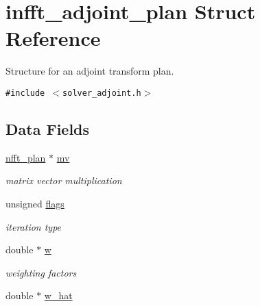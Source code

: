 \hypertarget{structinfft__adjoint__plan}{
\section{infft\_\-adjoint\_\-plan Struct Reference}
\label{structinfft__adjoint__plan}
}
Structure for an adjoint transform plan.  


{\tt \#include $<$solver\_\-adjoint.h$>$}

\subsection*{Data Fields}
\begin{CompactItemize}
\item 
\hypertarget{structinfft__adjoint__plan_320424336d0f74f0d24cc67053dea7ca}{
\hyperlink{structnfft__plan}{nfft\_\-plan} $\ast$ \hyperlink{structinfft__adjoint__plan_320424336d0f74f0d24cc67053dea7ca}{mv}}
\label{structinfft__adjoint__plan_320424336d0f74f0d24cc67053dea7ca}

\begin{CompactList}\small\item\em matrix vector multiplication \item\end{CompactList}\item 
\hypertarget{structinfft__adjoint__plan_83f3fc443fbf5c40336a46a8c1bdfaf8}{
unsigned \hyperlink{structinfft__adjoint__plan_83f3fc443fbf5c40336a46a8c1bdfaf8}{flags}}
\label{structinfft__adjoint__plan_83f3fc443fbf5c40336a46a8c1bdfaf8}

\begin{CompactList}\small\item\em iteration type \item\end{CompactList}\item 
\hypertarget{structinfft__adjoint__plan_67fabb54885946acaaad95a5a472b004}{
double $\ast$ \hyperlink{structinfft__adjoint__plan_67fabb54885946acaaad95a5a472b004}{w}}
\label{structinfft__adjoint__plan_67fabb54885946acaaad95a5a472b004}

\begin{CompactList}\small\item\em weighting factors \item\end{CompactList}\item 
\hypertarget{structinfft__adjoint__plan_76ad0c6eace967391553fd4939e70662}{
double $\ast$ \hyperlink{structinfft__adjoint__plan_76ad0c6eace967391553fd4939e70662}{w\_\-hat}}
\label{structinfft__adjoint__plan_76ad0c6eace967391553fd4939e70662}


\end{CompactItemize}
